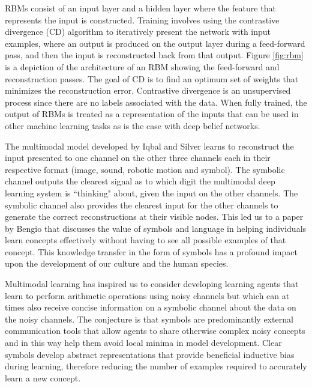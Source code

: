 RBMs consist of an input layer and a hidden layer where the feature that represents the input is constructed. Training involves using the contrastive divergence (CD) algorithm to iteratively present the network with input examples, where an output is produced on the output layer during a feed-forward pass, and then the input is reconstructed back from that output. Figure \ref{fig:rbm} is a depiction of the architecture of an RBM showing the feed-forward and reconstruction passes. The goal of CD is to find an optimum set of weights that minimizes the reconstruction error. Contrastive divergence is an unsupervised process since there are no labels associated with the data. When fully trained, the output of RBMs is treated as a representation of the inputs that can be used in other machine learning tasks as is the case with deep belief networks\cite{Hinton:2006:FLA:1161603.1161605}.

The multimodal model developed by Iqbal and Silver\cite{iqbal2016scalable} learns to reconstruct the input presented to one channel on the other three channels each in their respective format (image, sound, robotic motion and symbol). The symbolic channel outputs the clearest signal as to which digit the multimodal deep learning system is ``thinking" about, given the input on the other channels. The symbolic channel also provides the clearest input for the other channels to generate the correct reconstructions at their visible nodes. This led us to a paper by Bengio\cite{DBLP:journals/corr/abs-1203-2990} that discusses the value of symbols and language in helping individuals learn concepts effectively without having to see all possible examples of that concept. This knowledge transfer in the form of symbols has a profound impact upon the development of our culture and the human species. 

Multimodal learning has inspired us to consider developing learning agents that learn to perform arithmetic operations using noisy channels but which can at times also receive concise information on a symbolic channel about the data on the noisy channels. The conjecture is that symbols are predominantly external communication tools that allow agents to share otherwise complex noisy concepts and in this way help them avoid local minima in model development. Clear symbols develop abstract representations that provide beneficial inductive bias during learning, therefore reducing the number of examples required to accurately learn a new concept.